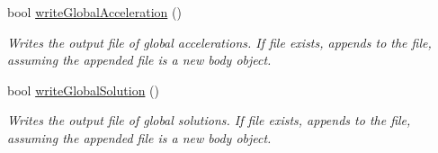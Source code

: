 \begin{DoxyCompactItemize}
bool \hyperlink{classosea_1_1ofreq_1_1_file_writer_aaff553c2e03cb1c1639e107cfeac3038}{write\-Global\-Acceleration} ()
\begin{DoxyCompactList}\small\item\em Writes the output file of global accelerations. If file exists, appends to the file, assuming the appended file is a new body object. \end{DoxyCompactList}\item 
bool \hyperlink{classosea_1_1ofreq_1_1_file_writer_a317649499b8c16dd529e2bf588e3be88}{write\-Global\-Solution} ()
\begin{DoxyCompactList}\small\item\em Writes the output file of global solutions. If file exists, appends to the file, assuming the appended file is a new body object. \end{DoxyCompactList}\end{DoxyCompactItemize}
